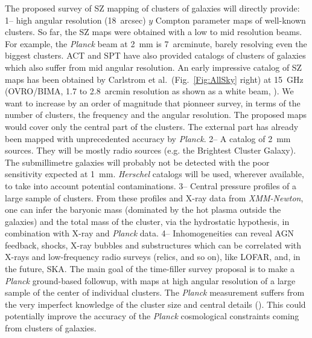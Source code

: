 \documentclass[10pt,a4paper,twoside,graphicx,color]{article}
\begin{document}
\vspace{-0.1cm}  The
proposed survey of SZ mapping of clusters of galaxies will directly
provide: 1-- high angular resolution (18~arcsec) $y$ Compton parameter
maps of well-known clusters. So far, the SZ maps were obtained with a
low to mid resolution beams. For example, the {\sl Planck} beam at
2~mm is 7~arcminute, barely resolving even the biggest clusters. ACT
and SPT have also provided catalogs of clusters of galaxies which also
suffer from mid angular resolution. An early impressive catalog of SZ
maps has been obtained by Carlstrom et al.~(Fig.~\ref{Fig:AllSky}
right) at 15~GHz (OVRO/BIMA, 1.7 to 2.8~arcmin resolution as shown as
a white beam, \cite{Reese2002}). We want to increase by an order of
magnitude that pionneer survey, in terms of the number of clusters,
the frequency and the angular resolution. The proposed maps would
cover only the central part of the clusters. The external part has
already been mapped with unprecedented accuracy by {\sl Planck}. 2-- A
catalog of 2~mm sources. They will be mostly radio sources (e.g. the
Brightest Cluster Galaxy). The submillimetre galaxies will probably
not be detected with the poor sensitivity expected at 1~mm. {\sl
  Herschel} catalogs will be used, wherever available, to take into
account potential contaminations. 3-- Central pressure profiles of a
large sample of clusters. From these profiles and X-ray data from {\sl
  XMM-Newton}, one can infer the baryonic mass (dominated by the hot
plasma outside the galaxies) and the total mass of the cluster, via
the hydrostatic hypothesis, in combination with X-ray and {\sl Planck}
data. 4-- Inhomogeneities can reveal AGN feedback, shocks, X-ray
bubbles and substructures which can be correlated with X-rays and
low-frequency radio surveys (relics, and so on), like LOFAR, and, in
the future, SKA. The main goal of the time-filler survey proposal is
to make a {\sl Planck} ground-based followup, with maps at high
angular resolution of a large sample of the center of individual
clusters. The {\sl Planck} measurement suffers from the very imperfect
knowledge of the cluster size and central details
(\cite{Planck2013PressProf}). This could potentially improve the
accuracy of the {\sl Planck} cosmological constraints coming from
clusters of galaxies.
\end{document}
